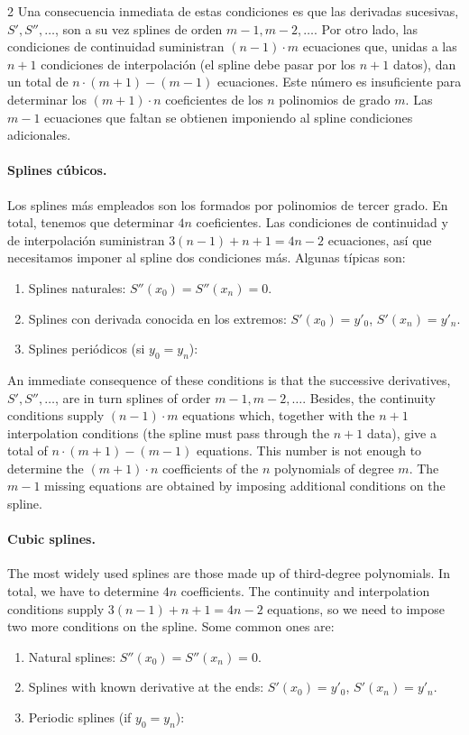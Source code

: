 \begin{paracol}{2}
Una consecuencia inmediata de estas condiciones es que las derivadas sucesivas, $S', S'', \dots$, son a su vez splines de orden $m-1, m-2, \dots$. Por otro lado, las condiciones de continuidad suministran $(n-1)\cdot m$ ecuaciones que, unidas a las $n+1$ condiciones de interpolación (el spline debe pasar por los $n+1$ datos), dan un total de $n\cdot (m+1)-(m-1)$ ecuaciones. Este número es insuficiente para determinar los $(m+1)\cdot n$ coeficientes de los $n$ polinomios de grado $m$. Las $m-1$ ecuaciones que faltan se obtienen imponiendo al spline condiciones adicionales.

\paragraph{Splines cúbicos.}  Los splines más empleados son los formados por polinomios de tercer grado. En total, tenemos que determinar $4n$ coeficientes. Las condiciones de continuidad y de interpolación suministran $3(n-1)+n+1=4n-2$ ecuaciones, así que necesitamos imponer al spline dos condiciones más. Algunas típicas son:
\begin{enumerate}
\item Splines naturales: $S''(x_0)=S''(x_n)=0$.
\item Splines con derivada conocida en los extremos: $S'(x_0)=y'_0$, $S'(x_n)=y'_n$.
\item Splines periódicos (si $y_0=y_n$):
\end{enumerate}
\switchcolumn
An immediate consequence of these conditions is that the successive derivatives, $S', S'', \dots$, are in turn splines of order $m-1, m-2, \dots$. Besides, the continuity conditions supply $(n-1)\cdot m$ equations which, together with the $n+1$ interpolation conditions (the spline must pass through the $n+1$ data), give a total of $n\cdot (m+1)-(m-1)$ equations. This number is not enough to determine the $(m+1)\cdot n$ coefficients of the $n$ polynomials of degree $m$. The $m-1$ missing equations are obtained by imposing additional conditions on the spline.

\paragraph{Cubic splines.}  The most widely used splines are those made up of third-degree polynomials. In total, we have to determine $4n$ coefficients. The continuity and interpolation conditions supply $3(n-1)+n+1=4n-2$ equations, so we need to impose two more conditions on the spline. Some common ones are:
\begin{enumerate}
	\item Natural splines: $S''(x_0)=S''(x_n)=0$.
	\item Splines with known derivative at the ends: $S'(x_0)=y'_0$, $S'(x_n)=y'_n$.
	\item Periodic splines (if $y_0=y_n$):
\end{enumerate}
\end{paracol}
